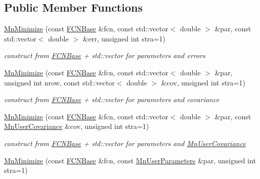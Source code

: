 \subsection*{Public Member Functions}
\begin{DoxyCompactItemize}
\item 
\mbox{\hyperlink{classROOT_1_1Minuit2_1_1MnMinimize_ab556cdc37be07557d060aa179a7e0d1f}{Mn\+Minimize}} (const \mbox{\hyperlink{classROOT_1_1Minuit2_1_1FCNBase}{F\+C\+N\+Base}} \&fcn, const std\+::vector$<$ double $>$ \&par, const std\+::vector$<$ double $>$ \&err, unsigned int stra=1)
\begin{DoxyCompactList}\small\item\em construct from \mbox{\hyperlink{classROOT_1_1Minuit2_1_1FCNBase}{F\+C\+N\+Base}} + std\+::vector for parameters and errors \end{DoxyCompactList}\item 
\mbox{\hyperlink{classROOT_1_1Minuit2_1_1MnMinimize_ad6015768309e01c6610185006008b2d5}{Mn\+Minimize}} (const \mbox{\hyperlink{classROOT_1_1Minuit2_1_1FCNBase}{F\+C\+N\+Base}} \&fcn, const std\+::vector$<$ double $>$ \&par, unsigned int nrow, const std\+::vector$<$ double $>$ \&cov, unsigned int stra=1)
\begin{DoxyCompactList}\small\item\em construct from \mbox{\hyperlink{classROOT_1_1Minuit2_1_1FCNBase}{F\+C\+N\+Base}} + std\+::vector for parameters and covariance \end{DoxyCompactList}\item 
\mbox{\hyperlink{classROOT_1_1Minuit2_1_1MnMinimize_a4cf2e37839cc454720ab3bd8041dffa9}{Mn\+Minimize}} (const \mbox{\hyperlink{classROOT_1_1Minuit2_1_1FCNBase}{F\+C\+N\+Base}} \&fcn, const std\+::vector$<$ double $>$ \&par, const \mbox{\hyperlink{classROOT_1_1Minuit2_1_1MnUserCovariance}{Mn\+User\+Covariance}} \&cov, unsigned int stra=1)
\begin{DoxyCompactList}\small\item\em construct from \mbox{\hyperlink{classROOT_1_1Minuit2_1_1FCNBase}{F\+C\+N\+Base}} + std\+::vector for parameters and \mbox{\hyperlink{classROOT_1_1Minuit2_1_1MnUserCovariance}{Mn\+User\+Covariance}} \end{DoxyCompactList}\item 
\mbox{\hyperlink{classROOT_1_1Minuit2_1_1MnMinimize_a0d930638a3d23f7ca1a8dc3f016a4730}{Mn\+Minimize}} (const \mbox{\hyperlink{classROOT_1_1Minuit2_1_1FCNBase}{F\+C\+N\+Base}} \&fcn, const \mbox{\hyperlink{classROOT_1_1Minuit2_1_1MnUserParameters}{Mn\+User\+Parameters}} \&par, unsigned int stra=1)

\end{DoxyCompactItemize}
